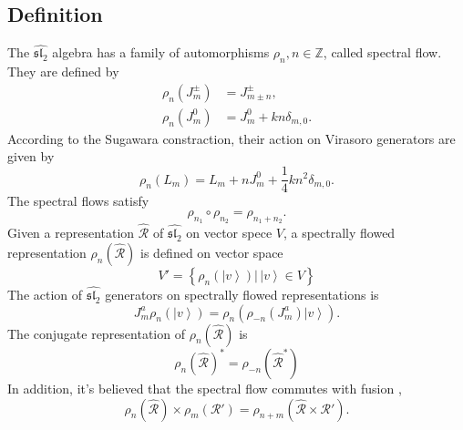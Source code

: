 \documentclass[10pt,a4paper]{article}
\numberwithin{equation}{section}
\newcommand{\ket}[1]{\left| #1 \right\rangle}
\begin{document}
\subsection{Definition}
The $\widehat{\mathfrak{sl}_{2}}$ algebra has a family of automorphisms $\rho_{n} , n \in \mathbb{Z}$, called spectral flow. They
are defined by 
\begin{equation}
    \begin{aligned}
        \rho_{n}(J^{\pm}_{m}) & = J^{\pm}_{m \pm n},\\
        \rho_{n}(J^{0}_{m}) & = J^{0}_{m} + k n \delta_{m,0}.
    \end{aligned}
\end{equation}
According to the Sugawara constraction, their action on Virasoro generators are given by 
\begin{equation}
    \rho_{n}(L_{m}) = L_{m} + n J^{0}_{m} + \frac{1}{4} k n^{2} \delta_{m,0}. \label{SpecFlowVira}
\end{equation}
The spectral flows satisfy
\begin{equation}
    \rho_{n_{1}} \circ \rho_{n_{2}} = \rho_{n_{1} + n_{2}}.
\end{equation}
Given a representation $\hat{\mathcal{R}} $ of $\widehat{\mathfrak{sl}_{2}}$ on vector spece $V$, a spectrally flowed representation 
$\rho_{n} \left(\hat{\mathcal{R}} \right)$ is defined on vector space
\begin{equation}
    V' = \left\{ \rho_{n}(\ket{v}) |\, \ket{v} \in V \right\}
\end{equation}
The action of $\widehat{\mathfrak{sl}_{2}}$ generators on spectrally flowed representations is 
\begin{equation}
    J^{a}_{m} \rho_{n} \left( \ket{v} \right) = \rho_{n}\left( \rho_{-n} \left(J^{a}_{m} \right) \ket{v} \right).
\end{equation}
The conjugate representation of $\rho_{n} \left(\hat{\mathcal{R}} \right)$ is 
\begin{equation}
    \rho_{n} \left( \hat{\mathcal{R}} \right)^{*} = \rho_{-n} \left(\hat{\mathcal{R}}^{*} \right)
\end{equation}
In addition, it's believed that the spectral flow commutes with fusion \cite{Gaberdiel:2001ny}, 
\begin{equation}
    \rho_{n} \left(\hat{\mathcal{R}}\right) \times \rho_{m} \left(\mathcal{R'}\right) = \rho_{n+m} \left(\hat{\mathcal{R}}\times \mathcal{R'}\right). \label{SpecFus}
\end{equation}
\end{document}
